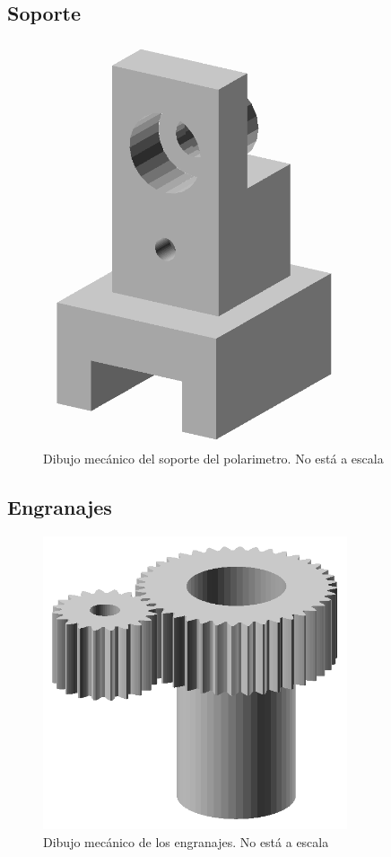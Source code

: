 \documentclass[12pt,a4paper]{article}
\begin{document}
    \subsection{Soporte}
    \vfill
    \begin{figure}[H]
    \centering
    \includegraphics[width=0.8\textwidth]{fig/polarimetro/soporte_mecanico}
    \caption{Dibujo mecánico del soporte del polarimetro. No está a escala}
    \label{fig:polarimetro/soporte_plano}
    \end{figure}
    \vfill

    \subsection{Engranajes}
    \vfill
    \begin{figure}[H]
    \centering
    \includegraphics[width=0.8\textwidth]{fig/polarimetro/engranajes_mecanico}
    \caption{Dibujo mecánico de los engranajes. No está a escala}
    \label{fig:polarimetro/engranajes_plano}
    \end{figure}
    \vfill
\end{document}
